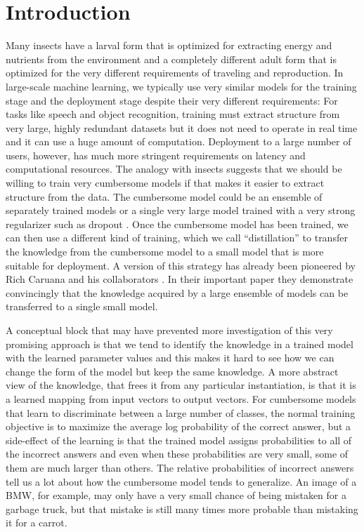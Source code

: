 \section{Introduction}

Many insects have a larval form that is optimized for extracting energy and nutrients from the environment and a
completely different adult form that is optimized for the very different requirements of traveling and reproduction.  In
large-scale machine learning, we typically use very similar models for the training stage and the deployment stage
despite their very different requirements: For tasks like speech and object recognition, training must extract structure
from very large, highly redundant datasets but it does not need to operate in real time and it can use a huge amount of
computation.  Deployment to a large number of users, however, has much more stringent requirements on latency and
computational resources.  The analogy with insects suggests that we should be willing to train very cumbersome models if
that makes it easier to extract structure from the data. The cumbersome model could be an ensemble of separately trained
models or a single very large model trained with a very strong regularizer such as dropout \cite{srivastava2014dropout}. Once the cumbersome model
has been trained, we can then use a different kind of training, which we call ``distillation'' to transfer the knowledge
from the cumbersome model to a small model that is more suitable for deployment.  A version of this strategy has
already been pioneered by Rich Caruana and his collaborators \cite{Caruana}. In their important paper they demonstrate
convincingly that the knowledge acquired by a large ensemble of models can be transferred to a single small model.

A conceptual block that may have prevented more investigation of this very promising approach is that we tend to
identify the knowledge in a trained model with the learned parameter values and this makes it hard to see how we can
change the form of the model but keep the same knowledge.  A more abstract view of the knowledge, that frees it from any
particular instantiation, is that it is a learned mapping from input vectors to output vectors.  For cumbersome models
that learn to discriminate between a large number of classes, the normal training objective is to maximize the average log
probability of the correct answer, but a side-effect of the learning is that the trained model assigns
probabilities to all of the incorrect answers and even when these probabilities are very small, some of them are much
larger than others.  The relative probabilities of incorrect answers tell us a lot about how the cumbersome model
tends to generalize.  An image of a BMW, for example, may only have a very small chance of being mistaken for a garbage
truck, but that mistake is still many times more probable than mistaking it for a carrot. 


